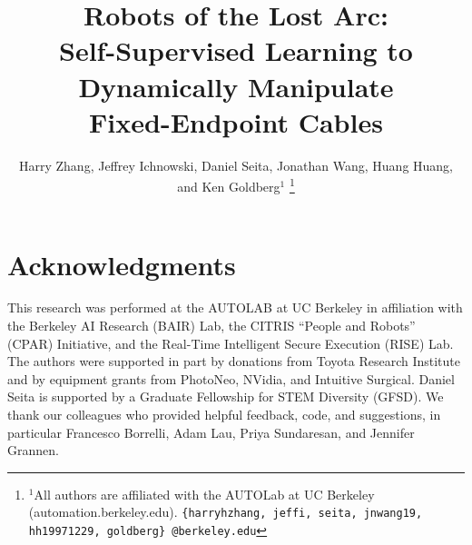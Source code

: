 \documentclass[letterpaper, 10 pt, conference]{ieeeconf}
\title{\LARGE \bf Robots of the Lost Arc:\\ Self-Supervised Learning to Dynamically Manipulate\\ Fixed-Endpoint Cables}
\author{Harry Zhang, Jeffrey Ichnowski, Daniel Seita, Jonathan Wang, Huang Huang, and Ken Goldberg$^1$%
\thanks{$^1$All authors are affiliated with the AUTOLab at UC Berkeley (automation.berkeley.edu).
{\tt\small \{harryhzhang, jeffi, seita, jnwang19, hh19971229, goldberg\} @berkeley.edu}}}
\begin{document}
\maketitle
\thispagestyle{empty}
\pagestyle{empty}

\begin{abstract}

\end{abstract}




%






\section{Acknowledgments}

\footnotesize
This research was performed at the AUTOLAB at UC Berkeley in
affiliation with the Berkeley AI Research (BAIR) Lab, the CITRIS ``People and Robots'' (CPAR) Initiative, and the Real-Time Intelligent Secure Execution (RISE) Lab. The authors were supported in part by donations from Toyota Research Institute and by equipment grants from PhotoNeo, NVidia, and Intuitive Surgical. Daniel Seita is supported by a Graduate Fellowship for STEM Diversity (GFSD). We thank our colleagues who provided helpful feedback, code, and suggestions, in particular Francesco Borrelli, Adam Lau, Priya Sundaresan, and Jennifer Grannen.




\clearpage
% 
\end{document}
